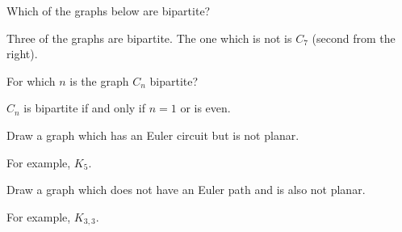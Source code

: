 \begin{questions}
	
	


\question Which of the graphs below are bipartite?  

\begin{center}
  \hfill
  \hfill
  \hfill 
\end{center}

	\begin{answer}
		Three of the graphs are bipartite.  The one which is not is $C_7$ (second from the right).
	\end{answer}
	
	
	


\question For which $n$ is the graph $C_n$ bipartite?

	\begin{answer}
		$C_n$ is bipartite if and only if $n = 1$ or is even.
	\end{answer}
	
	
	


\question Draw a graph which has an Euler circuit but is not planar.

	\begin{answer}
		For example, $K_5$.
	\end{answer}
	
	
	


\question Draw a graph which does not have an Euler path and is also not planar.

	\begin{answer}
		For example, $K_{3,3}$.
	\end{answer}
	

\end{questions}
